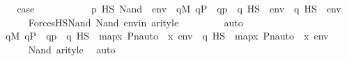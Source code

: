 \begin{isabellebody}
\ \ \isamarkupfalse%
\ \isamarkupfalse%
\ {\isacharquery}{\kern0pt}case\isanewline
\ \ \isamarkupfalse%
\ {\isacharminus}{\kern0pt}\ \isanewline
\ \ \ \ \isamarkupfalse%
\ {\isachardoublequoteopen}p\ {\isasymtturnstile}HS\ Nand{\isacharparenleft}{\kern0pt}{\isasymphi}{\isacharcomma}{\kern0pt}\ {\isasympsi}{\isacharparenright}{\kern0pt}\ env\ {\isasymlongleftrightarrow}\ {\isasymnot}{\isacharparenleft}{\kern0pt}{\isasymexists}q{\isasymin}M{\isachardot}{\kern0pt}\ q{\isasymin}P\ {\isasymand}\ q{\isasympreceq}p\ {\isasymand}\ {\isacharparenleft}{\kern0pt}q\ {\isasymtturnstile}HS\ {\isasymphi}\ env{\isacharparenright}{\kern0pt}\ {\isasymand}\ {\isacharparenleft}{\kern0pt}q\ {\isasymtturnstile}HS\ {\isasympsi}\ env{\isacharparenright}{\kern0pt}{\isacharparenright}{\kern0pt}{\isachardoublequoteclose}\isanewline
\ \ \ \ \ \ \isamarkupfalse%
\ ForcesHS{\isacharunderscore}{\kern0pt}Nand\ Nand\ envin\ arityle\ \isanewline
\ \ \ \ \ \ \isamarkupfalse%
\ auto\isanewline
\ \ \ \ \isamarkupfalse%
\ \isamarkupfalse%
\ {\isachardoublequoteopen}{\isachardot}{\kern0pt}{\isachardot}{\kern0pt}{\isachardot}{\kern0pt}\ {\isasymlongleftrightarrow}\ {\isasymnot}{\isacharparenleft}{\kern0pt}{\isasymexists}q{\isasymin}M{\isachardot}{\kern0pt}\ q{\isasymin}P\ {\isasymand}\ q{\isasympreceq}p\ {\isasymand}\ {\isacharparenleft}{\kern0pt}{\isasympi}{\isacharbackquote}{\kern0pt}q\ {\isasymtturnstile}HS\ {\isasymphi}\ map{\isacharparenleft}{\kern0pt}{\isasymlambda}x{\isachardot}{\kern0pt}\ Pn{\isacharunderscore}{\kern0pt}auto{\isacharparenleft}{\kern0pt}{\isasympi}{\isacharparenright}{\kern0pt}\ {\isacharbackquote}{\kern0pt}\ x{\isacharcomma}{\kern0pt}\ env{\isacharparenright}{\kern0pt}{\isacharparenright}{\kern0pt}\ {\isasymand}\ {\isacharparenleft}{\kern0pt}{\isasympi}{\isacharbackquote}{\kern0pt}q\ {\isasymtturnstile}HS\ {\isasympsi}\ map{\isacharparenleft}{\kern0pt}{\isasymlambda}x{\isachardot}{\kern0pt}\ Pn{\isacharunderscore}{\kern0pt}auto{\isacharparenleft}{\kern0pt}{\isasympi}{\isacharparenright}{\kern0pt}\ {\isacharbackquote}{\kern0pt}\ x{\isacharcomma}{\kern0pt}\ env{\isacharparenright}{\kern0pt}{\isacharparenright}{\kern0pt}{\isacharparenright}{\kern0pt}{\isachardoublequoteclose}\isanewline
\ \ \ \ \ \ \isamarkupfalse%
\ Nand\ arityle\ \isamarkupfalse%
\ auto\isanewline
\ \ \ \ \isamarkupfalse%
\ \isamarkupfalse%

\end{isabellebody}
